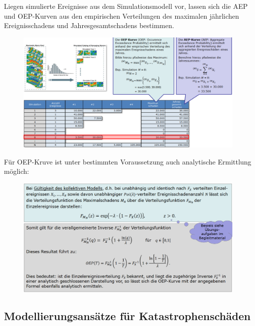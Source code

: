 \documentclass[12pt]{report}
\theoremstyle{dotless}
\theoremstyle{definition}
\begin{document}
Liegen simulierte Ereignisse aus dem Simulationsmodell vor, lassen sich die AEP und OEP-Kurven
aus den empirischen Verteilungen des maximalen jährlichen Ereignisschadens und
Jahresgesamtschadens bestimmen. 

\begin{figure}[ht]
	\centering
	\includegraphics[width= \textwidth]{Bilder/OEPAEP.png}
\end{figure}
 \vspace{4cm}
Für OEP-Kruve ist unter bestimmten Voraussetzung auch analytische Ermittlung möglich:
\begin{figure}[ht]
	\centering
	\includegraphics[width= \textwidth]{Bilder/Folie39.png}
\end{figure}

\subsection{Modellierungsansätze für Katastrophenschäden}
\end{document}
